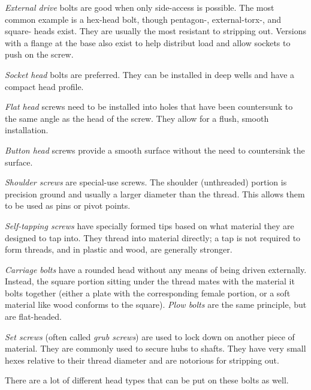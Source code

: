 	\begin{asparaenum}[a)]
		\item \textit{External drive} bolts are good when only side-access is possible. The most common example is a hex-head bolt, though pentagon-, external-torx-, and square- heads exist. They are usually the most resistant to stripping out. Versions with a flange at the base also exist to help distribut load and allow sockets to push on the screw.
		\item \textit{Socket head} bolts are preferred. They can be installed in deep wells and have a compact head profile.
		\item \textit{Flat head} screws need to be installed into holes that have been countersunk to the same angle as the head of the screw. They allow for a flush, smooth installation.
		\item \textit{Button head} screws provide a smooth surface without the need to countersink the surface.
		\item \textit{Shoulder screws} are special-use screws. The shoulder (unthreaded) portion is precision ground and usually a larger diameter than the thread. This allows them to be used as pins or pivot points.
		\item \textit{Self-tapping screws} have specially formed tips based on what material they are designed to tap into. They thread into material directly; a tap is not required to form threads, and in plastic and wood, are generally stronger.
		\item \textit{Carriage bolts} have a rounded head without any means of being driven externally. Instead, the square portion sitting under the thread mates with the material it bolts together (either a plate with the corresponding female portion, or a soft material like wood conforms to the square). \textit{Plow bolts} are the same principle, but are flat-headed.
		\item \textit{Set screws} (often called \textit{grub screws}) are used to lock down on another piece of material. They are commonly used to secure hubs to shafts. They have very small hexes relative to their thread diameter and are notorious for stripping out.
	\end{asparaenum}
	
	There are a lot of different head types that can be put on these bolts as well. 
	

